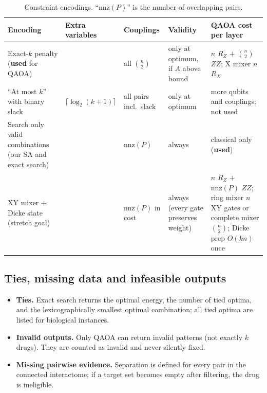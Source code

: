 \begin{table}[ht]
\centering
\small
\begin{tabularx}{\linewidth}{>{\raggedright\arraybackslash}p{3.1cm}>{\raggedright\arraybackslash}p{1.8cm}>{\raggedright\arraybackslash}p{2.6cm}>{\raggedright\arraybackslash}p{2.3cm}X}
\toprule
Encoding & Extra variables & Couplings & Validity & QAOA cost per layer \\
\midrule
Exact-$k$ penalty (\textbf{used} for QAOA) & 0 & all $\binom{n}{2}$ & only at optimum, if $A$ above bound & $n$ $R_Z$ + $\binom{n}{2}$ $ZZ$; X mixer $n$ $R_X$ \\
``At most $k$'' with binary slack & $\lceil\log_2(k+1)\rceil$ & all pairs incl.\ slack & only at optimum & more qubits and couplings; not used \\
Search only valid combinations (our SA and exact search) & 0 & $\mathrm{nnz}(P)$ & always & classical only (\textbf{used}) \\
XY mixer + Dicke state (stretch goal) & 0 & $\mathrm{nnz}(P)$ in cost & always (every gate preserves weight) & $n$ $R_Z$ + $\mathrm{nnz}(P)$ $ZZ$; ring mixer $n$ XY gates or complete mixer $\binom{n}{2}$; Dicke prep $O(kn)$ once \\
\bottomrule
\end{tabularx}
\caption{Constraint encodings. ``$\mathrm{nnz}(P)$'' is the number of overlapping pairs.}
\label{tab:encodings}
\end{table}

\subsection{Ties, missing data and infeasible outputs}

\begin{itemize}
\item \textbf{Ties.} Exact search returns the optimal energy, the number of tied optima, and the lexicographically smallest optimal combination; all tied optima are listed for biological instances.
\item \textbf{Invalid outputs.} Only QAOA can return invalid patterns (not exactly $k$ drugs). They are counted as invalid and never silently fixed.
\item \textbf{Missing pairwise evidence.} Separation is defined for every pair in the connected interactome; if a target set becomes empty after filtering, the drug is ineligible.
\end{itemize}

